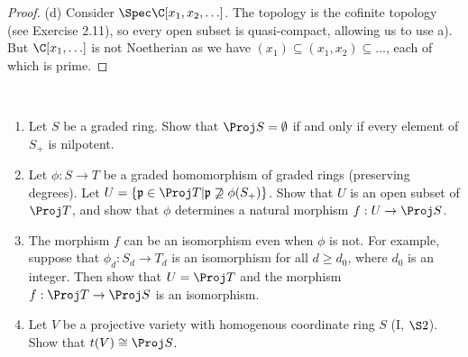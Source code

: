 \begin{proof}
	(d) Consider $\Spec \C[x_{1},x_{2},\ldots] $.
	The topology is the cofinite topology (see Exercise 2.11), so every open subset is quasi-compact, allowing us to use a).
	But $\C[x_{1},\ldots] $ is not Noetherian as we have $(x_{1}) \subseteq (x_{1},x_{2}) \subseteq \ldots $, each of which is prime.
\end{proof}

\begin{exercise}
	~
	\begin{enumerate}
		\item Let $S $ be a graded ring. Show that $\Proj S = \emptyset $ if and only if every element of $S_+ $ is nilpotent.
		\item Let $\phi :S \to T $ be a graded homomorphism of graded rings (preserving degrees). Let $U = \{\mathfrak{p} \in \Proj T | \mathfrak{p} \not \supseteq  \phi (S_+)\}   $. Show that $U $ is an open subset of $\Proj T $, and show that $\phi $ determines a natural morphism $f: U \to \Proj S$.
		\item The morphism $f $ can be an isomorphism even when $\phi  $ is not. For example, suppose that $\phi _d: S_d \to T_d $ is an isomorphism for all $d \ge  d_{0} $, where $d_{0} $ is an integer. Then show that $U = \Proj T $ and the morphism $f: \Proj T \to \Proj S $ is an isomorphism.
		\item Let $V $ be a projective variety with homogenous coordinate ring $S $ (I, $\S 2$). Show that $t(V) \cong \Proj S $.
	\end{enumerate}
\end{exercise}
